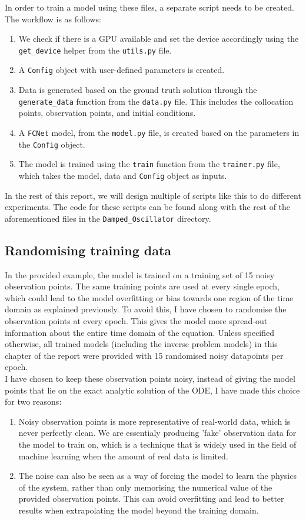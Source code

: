 \documentclass[we,twoside,openright,a4paper,11pt]{uantwerpenbamathesis}
\begin{document}
In order to train a model using these files, a separate script needs to be created. The workflow is as follows:
\begin{enumerate}
    \item We check if there is a GPU available and set the device accordingly using the \verb|get_device| helper from the \verb|utils.py| file.
    \item A \verb|Config| object with user-defined parameters is created.
    \item Data is generated based on the ground truth solution through the \verb|generate_data| function from the \verb|data.py| file. This includes the collocation points, observation points, and initial conditions.
    \item A \verb|FCNet| model, from the \verb|model.py| file, is created based on the parameters in the \verb|Config| object.
    \item The model is trained using the \verb|train| function from the \verb|trainer.py| file, which takes the model, data and \verb|Config| object as inputs.
\end{enumerate}
In the rest of this report, we will design multiple of scripts like this to do different experiments. The code for these scripts can be found along with the rest of the aforementioned files in the \verb|Damped_Oscillator| directory.
\subsection{Randomising training data}
In the provided example, the model is trained on a training set of 15 noisy observation points. The same training points are used at every single epoch, which could lead to the model overfitting or bias towards one region of the time domain as explained previously. To avoid this, I have chosen to randomise the observation points at every epoch. This gives the model more spread-out information about the entire time domain of the equation. Unless specified otherwise, all trained models (including the inverse problem models) in this chapter of the report were provided with 15 randomised noisy datapoints per epoch.\\

I have chosen to keep these observation points noisy, instead of giving the model points that lie on the exact analytic solution of the ODE, I have made this choice for two reasons:
\begin{enumerate}
    \item Noisy observation points is more representative of real-world data, which is never perfectly clean. We are essentialy producing 'fake' observation data for the model to train on, which is a technique that is widely used in the field of machine learning when the amount of real data is limited.
    \item The noise can also be seen as a way of forcing the model to learn the physics of the system, rather than only memorising the numerical value of the provided observation points. This can avoid overfitting and lead to better results when extrapolating the model beyond the training domain.
\end{enumerate}
\end{document}
